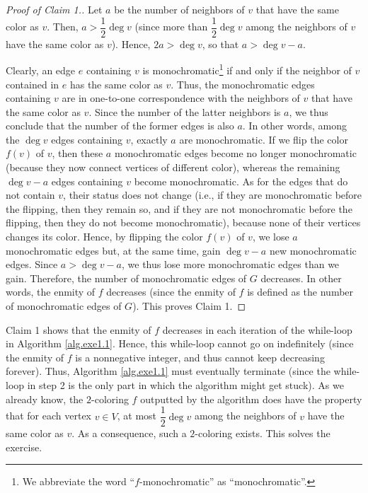 \documentclass[paper=a4, fontsize=12pt]{scrartcl} %
\newcommand{\tup}[1]{\left( #1 \right)}
\theoremstyle{plainsl}
\theoremstyle{definition}
\theoremstyle{remark}
\begin{document}
\begin{proof}[Proof of Claim 1.]
Let $a$ be the number of neighbors of $v$ that have the same color as
$v$. Then, $a > \dfrac{1}{2} \deg v$ (since more than
$\dfrac{1}{2} \deg v$ among the neighbors of $v$ have the same color
as $v$). Hence, $2a > \deg v$, so that $a > \deg v - a$.

Clearly, an edge $e$ containing $v$ is monochromatic\footnote{We
abbreviate the word ``$f$-monochromatic'' as ``monochromatic''.}
if and only if the neighbor of $v$ contained in $e$ has the same color
as $v$.
Thus, the monochromatic edges containing $v$ are in one-to-one
correspondence with the neighbors of $v$ that have the same color as
$v$. Since the number of the latter neighbors is $a$, we thus conclude
that the number of the former edges is also $a$. In other words, among
the $\deg v$ edges containing $v$, exactly $a$ are monochromatic.
If we flip the color $f \tup{v}$ of $v$, then these $a$ monochromatic
edges become no longer monochromatic (because they now connect
vertices of different color), whereas the remaining $\deg v - a$ edges
containing $v$ become monochromatic. As for the edges that do not
contain $v$, their status does not change (i.e., if they are
monochromatic before the flipping, then they remain so, and
if they are not monochromatic before the flipping, then they do not
become monochromatic), because none of their vertices changes its
color.
Hence, by flipping the color $f \tup{v}$ of $v$, we lose $a$
monochromatic edges but, at the same time, gain $\deg v - a$ new
monochromatic edges. Since $a > \deg v - a$, we thus lose
more monochromatic edges than we gain. Therefore, the number of
monochromatic edges of $G$ decreases. In other words, the enmity
of $f$ decreases (since the enmity of $f$ is defined as the number
of monochromatic edges of $G$). This proves Claim 1.
\end{proof}

Claim 1 shows that the enmity of $f$ decreases in each iteration of
the while-loop in Algorithm \ref{alg.exe1.1}. Hence, this while-loop
cannot go on indefinitely (since the enmity of $f$ is a nonnegative
integer, and thus cannot keep decreasing forever). Thus,
Algorithm \ref{alg.exe1.1} must eventually terminate (since the
while-loop in step 2 is the only part in which the algorithm might
get stuck). As we already
know, the $2$-coloring $f$ outputted by the algorithm
does have the property that for each vertex
$v \in V$, at most $\dfrac{1}{2} \deg v$ among the neighbors of $v$
have the same color as $v$. As a consequence, such a $2$-coloring
exists. This solves the exercise.
\end{document}
